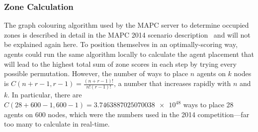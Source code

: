 \subsubsection{Zone Calculation}\label{alg:zon_calculation}
The graph colouring algorithm used by the MAPC server to determine occupied zones is described in detail in the MAPC 2014 scenario description~\cite{ahlbrecht_mapc_2014} and will not be explained again here.
To position themselves in an optimally-scoring way, agents could run the same algorithm locally to calculate the agent placement that will lead to the highest total sum of zone scores in each step by trying every possible permutation.
However, the number of ways to place $n$ agents on $k$ nodes is $C \left (n+r-1,r-1\right )= \frac{\left(n+r-1 \right )!}{n!\left(r-1 \right )!}$, a number that increases rapidly with $n$ and $k$.
In particular, there are $C \left (28+600-1,600-1 \right ) =\num{3.7463887025070038e+48}$ ways to place 28 agents on 600 nodes, which were the numbers used in the 2014 competition---far too many to calculate in real-time.

